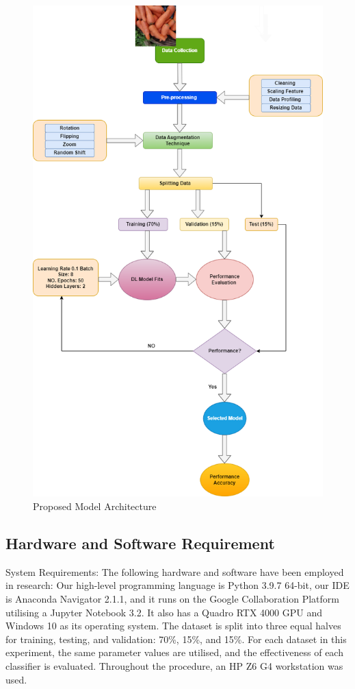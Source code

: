 \documentclass[a4paper,fleqn]{cas-sc}
\begin{document}
\begin{figure}[!ht]
\centering
\includegraphics[scale=0.5]{Proposed model Architecture}
\caption{Proposed Model Architecture}
\label{}
\end{figure}


\subsection{Hardware and Software Requirement}
System Requirements: The following hardware and software have been employed in research: Our high-level programming language is Python 3.9.7 64-bit, our IDE is Anaconda Navigator 2.1.1, and it runs on the Google Collaboration Platform utilising a Jupyter Notebook 3.2. It also has a Quadro RTX 4000 GPU and Windows 10 as its operating system. The dataset is split into three equal halves for training, testing, and validation: 70\%, 15\%, and 15\%. For each dataset in this experiment, the same parameter values are utilised, and the effectiveness of each classifier is evaluated. Throughout the procedure, an HP Z6 G4 workstation was used.
\end{document}

